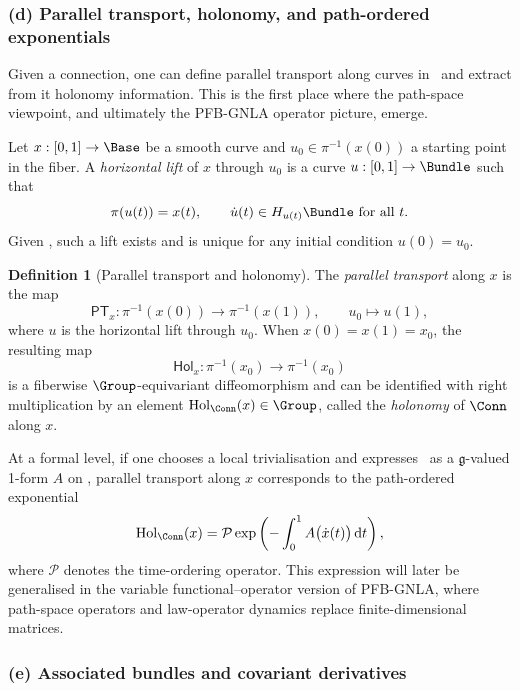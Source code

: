 \documentclass[11pt]{book}
\theoremstyle{plain}
\theoremstyle{definition}
\newtheorem{definition}[theorem]{Definition} \theoremstyle{remark}
\begin{document}
\subsubsection*{(d) Parallel transport, holonomy, and path-ordered exponentials}

Given a connection, one can define parallel transport along curves in
\Base\ and extract from it holonomy information. This is the first
place where the path-space viewpoint, and ultimately the PFB-GNLA
operator picture, emerge.



Let $x:[0,1]\to\Base$ be a smooth curve and $u_0\in\pi^{-1}(x(0))$ a
starting point in the fiber. A \emph{horizontal lift} of $x$ through
$u_0$ is a curve $u:[0,1]\to\Bundle$ such that
\[
   \pi(u(t)) = x(t),\qquad
   \dot{u}(t)\in H_{u(t)}\Bundle\ \text{for all }t.
\]
Given \Conn, such a lift exists and is unique for any initial condition
$u(0)=u_0$.

\begin{definition}[Parallel transport and holonomy]
The \emph{parallel transport} along $x$ is the map
  \[
     \mathsf{PT}_x:
       \pi^{-1}(x(0))\longrightarrow\pi^{-1}(x(1)),
     \qquad
     u_0\longmapsto u(1),
  \]
  where $u$ is the horizontal lift through $u_0$. When
  $x(0)=x(1)=x_0$, the resulting map
  \[
     \mathsf{Hol}_x:
       \pi^{-1}(x_0)\longrightarrow\pi^{-1}(x_0)
  \]
  is a fiberwise $\Group$-equivariant diffeomorphism and can be
  identified with right multiplication by an element
  $\mathrm{Hol}_\Conn(x)\in\Group$, called the \emph{holonomy} of
  $\Conn$ along $x$.
\end{definition}

At a formal level, if one chooses a local trivialisation and expresses
\Conn\ as a $\mathfrak{g}$-valued 1-form $A$ on \Base, parallel
transport along $x$ corresponds to the path-ordered exponential
\[
   \mathrm{Hol}_\Conn(x)
   =
   \mathcal{P}\exp\left(
     -\int_0^1 A\bigl(\dot{x}(t)\bigr)\,\mathrm{d}t
   \right),
\]
where $\mathcal{P}$ denotes the time-ordering operator. This expression
will later be generalised in the variable functional–operator version
of PFB-GNLA, where path-space operators and law-operator dynamics
replace finite-dimensional matrices.



\subsubsection*{(e) Associated bundles and covariant derivatives}
\end{document}
